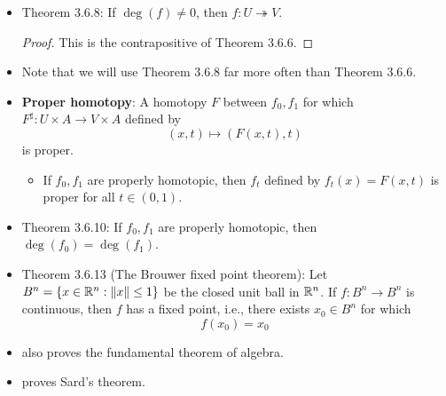 \documentclass[../notes.tex]{subfiles}
\begin{document}
\begin{itemize}
\begin{proof}
        \begin{equation*}
            0 = \int_Uf^*\omega
            = \deg(f)\int_V\omega
            = \deg(f)
        \end{equation*}
    \end{proof}
    \item Theorem 3.6.8: If $\deg(f)\neq 0$, then $f:U\twoheadrightarrow V$.
    \begin{proof}
        This is the contrapositive of Theorem 3.6.6.
    \end{proof}
    \item Note that we will use Theorem 3.6.8 far more often than Theorem 3.6.6.
    \item \textbf{Proper homotopy}: A homotopy $F$ between $f_0,f_1$ for which $F^\sharp:U\times A\to V\times A$ defined by
    \begin{equation*}
        (x,t) \mapsto (F(x,t),t)
    \end{equation*}
    is proper.
    \begin{itemize}
        \item If $f_0,f_1$ are properly homotopic, then $f_t$ defined by $f_t(x)=F(x,t)$ is proper for all $t\in(0,1)$.
    \end{itemize}
    \item Theorem 3.6.10: If $f_0,f_1$ are properly homotopic, then $\deg(f_0)=\deg(f_1)$.
    \item Theorem 3.6.13 (The Brouwer fixed point theorem): Let $B^n=\{x\in\mathbb{R}^n:\norm{x}\leq 1\}$ be the closed unit ball in $\mathbb{R}^n$. If $f:B^n\to B^n$ is continuous, then $f$ has a fixed point, i.e., there exists $x_0\in B^n$ for which
    \begin{equation*}
        f(x_0) = x_0
    \end{equation*}
    \item \textcite{bib:DifferentialForms} also proves the fundamental theorem of algebra.
    \item \textcite{bib:DifferentialForms} proves Sard's theorem.
\end{itemize}
\end{document}
